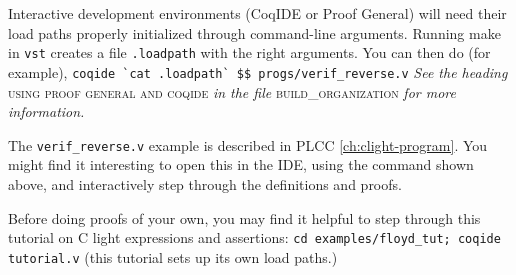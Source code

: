 \documentclass[12pt,fleqn,openany,oneside,showtrims]{memoir}
\begin{document}
Interactive development environments (CoqIDE or Proof General)
will need their load paths properly initialized through 
command-line arguments.  Running \textsf{make} in 
\lstinline{vst} creates a file \lstinline{.loadpath} with
the right arguments.  You can then do (for example),
\newline
\lstinline{coqide `cat .loadpath` $$ progs/verif_reverse.v}
\newline
\emph{See the heading} 
\textsc{using proof general and coqide}
\emph{in the file} \textsc{build\_organization}
\emph{for more information.}

The \lstinline{verif_reverse.v} example is described
in PLCC \autoref{ch:clight-program}.
You might find it interesting to open this in the IDE,
using the command shown above,
and interactively step through the definitions and proofs.

Before doing proofs of your own, you may find it helpful
to step through this tutorial on C light expressions and
assertions:\newline
\lstinline{cd examples/floyd_tut; coqide tutorial.v}\newline
(this tutorial sets up its own load paths.)
\end{document}
